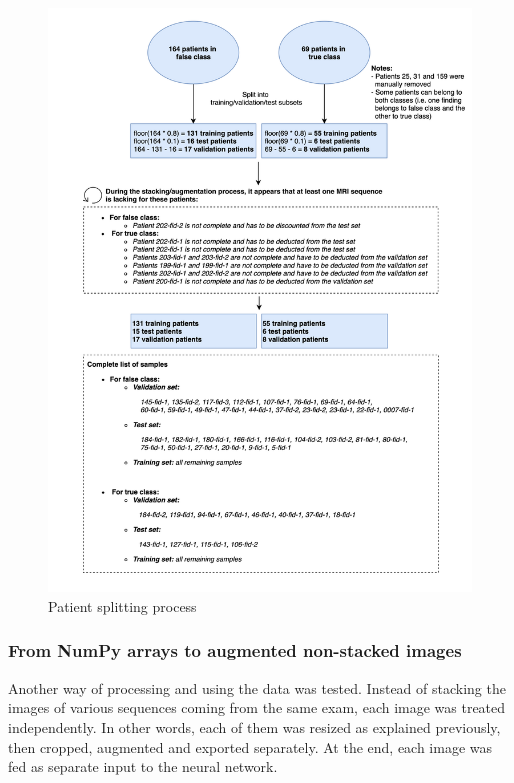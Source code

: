 \begin{figure}[!h]
\centering
\includegraphics[width=1\textwidth, keepaspectratio=true]{./figures/paper_reproduction_split.png}
\caption{Patient splitting process}
\label{fig:paper_reproduction_split}
\end{figure}


\subsubsection{From NumPy arrays to augmented non-stacked images}
\setlength{\marginparwidth}{3cm}\leavevmode {}Another way of processing and using the data was tested. Instead of stacking the images of various sequences coming from the same exam, each image was treated independently. In other words, each of them was resized as explained previously, then cropped, augmented and exported separately. At the end, each image was fed as separate input to the neural network.

